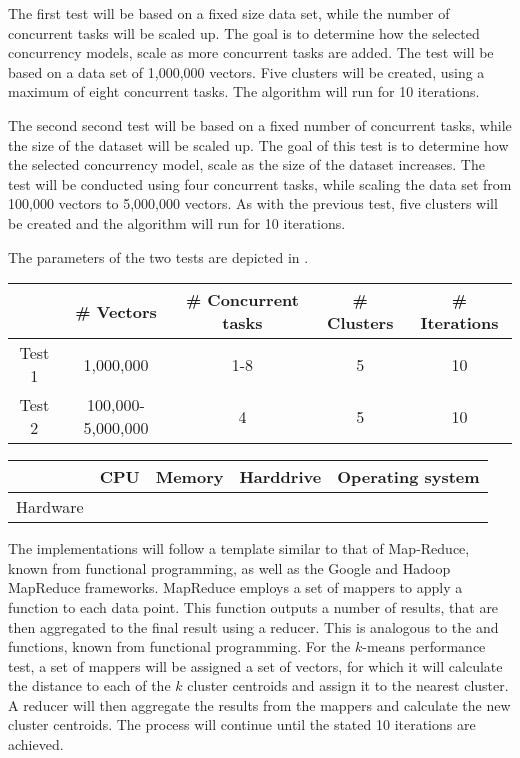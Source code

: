 The first test will be based on a fixed size data set, while the number of concurrent tasks will be scaled up. The goal is to determine how the selected concurrency models, scale as more concurrent tasks are added. The test will be based on a data set of 1,000,000 vectors. Five clusters will be created, using a maximum of eight concurrent tasks. The algorithm will run for 10 iterations.

The second second test will be based on a fixed number of concurrent tasks, while the size of the dataset will be scaled up. The goal of this test is to determine how the selected concurrency model, scale as the size of the dataset increases. The test will be conducted using four concurrent tasks, while scaling the data set from 100,000 vectors to 5,000,000 vectors. As with the previous test, five clusters will be created and the algorithm will run for 10 iterations.

The parameters of the two tests are depicted in .

\begin{center}
\begin{table}[h]
\begin{tabular}{c|cccc}
       & \# Vectors        & \# Concurrent tasks 	& \# Clusters & \# Iterations \\ \hline
Test 1 & 1,000,000         & 1-8        			& 5           & 10            \\
Test 2 & 100,000-5,000,000 & 4          			& 5           & 10           
\end{tabular}
\end{table}
 \label{tab:test_description} 
\end{center}

\begin{center}
\begin{table}[h]
\begin{tabular}{c|cccc}
         & CPU & Memory & Harddrive & Operating system \\ \hline
Hardware &     &        &           &                 
\end{tabular}
\end{table}
 \label{tab:hardware_specs} 
\end{center}

The implementations will follow a template similar to that of Map-Reduce\cite{dean2008mapreduce}, known from functional programming, as well as the Google and Hadoop MapReduce frameworks. MapReduce employs a set of mappers to apply a function to each data point. This function outputs a number of results, that are then aggregated to the final result using a reducer. This is analogous to the  and  functions, known from functional programming. For the $k$-means performance test, a set of mappers will be assigned a set of vectors, for which it will calculate the distance to each of the $k$ cluster centroids and assign it to the nearest cluster. A reducer will then aggregate the results from the mappers and calculate the new cluster centroids. The process will continue until the stated 10 iterations are achieved.


